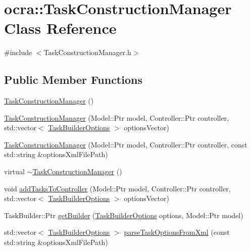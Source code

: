 \hypertarget{classocra_1_1TaskConstructionManager}{}\section{ocra\+:\+:Task\+Construction\+Manager Class Reference}
\label{classocra_1_1TaskConstructionManager}


{\ttfamily \#include $<$Task\+Construction\+Manager.\+h$>$}

\subsection*{Public Member Functions}
\begin{DoxyCompactItemize}
\item 
\hyperlink{classocra_1_1TaskConstructionManager_aaca5f4d8ed3ee26c1d26dcee88532428}{Task\+Construction\+Manager} ()
\item 
\hyperlink{classocra_1_1TaskConstructionManager_a290841cfd953f5162913f849e9b5eeaf}{Task\+Construction\+Manager} (Model\+::\+Ptr model, Controller\+::\+Ptr controller, std\+::vector$<$ \hyperlink{classocra_1_1TaskBuilderOptions}{Task\+Builder\+Options} $>$ options\+Vector)
\item 
\hyperlink{classocra_1_1TaskConstructionManager_a946b02d5d8d3a75f927c3b87f3aeea1a}{Task\+Construction\+Manager} (Model\+::\+Ptr model, Controller\+::\+Ptr controller, const std\+::string \&options\+Xml\+File\+Path)
\item 
virtual \hyperlink{classocra_1_1TaskConstructionManager_a6a12b900d600357c304cd445674a3004}{$\sim$\+Task\+Construction\+Manager} ()
\item 
void \hyperlink{classocra_1_1TaskConstructionManager_a86c218a04949b010a7ee4f99a8b0cd56}{add\+Tasks\+To\+Controller} (Model\+::\+Ptr model, Controller\+::\+Ptr controller, std\+::vector$<$ \hyperlink{classocra_1_1TaskBuilderOptions}{Task\+Builder\+Options} $>$ options\+Vector)
\item 
Task\+Builder\+::\+Ptr \hyperlink{classocra_1_1TaskConstructionManager_a5fac8f2d0057aba4856a7c7fd280eb92}{get\+Builder} (\hyperlink{classocra_1_1TaskBuilderOptions}{Task\+Builder\+Options} options, Model\+::\+Ptr model)
\item 
std\+::vector$<$ \hyperlink{classocra_1_1TaskBuilderOptions}{Task\+Builder\+Options} $>$ \hyperlink{classocra_1_1TaskConstructionManager_ac15f4ecd951f446e1f8a8bb33cc6c044}{parse\+Task\+Options\+From\+Xml} (const std\+::string \&options\+Xml\+File\+Path)
\end{DoxyCompactItemize}



